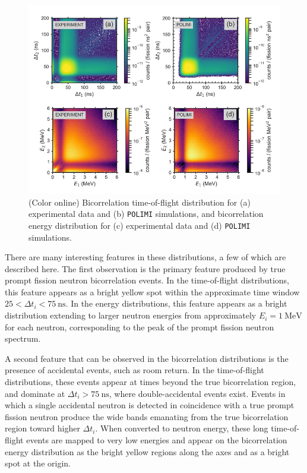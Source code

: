 \documentclass[preprint,12pt]{elsarticle}
\newcommand{\polimi}          {\texttt{POLIMI}\xspace}
\newcommand{\coloronline}     {(Color online)\xspace}
\newcommand{\Dti}{\ensuremath{\Delta t_i}\xspace}
\newcommand{\Ei}{\ensuremath{E_i}\xspace}
\newcommand{\genunit}[2]{\ensuremath{#1~\text{#2}}\xspace}
\newcommand{\MeV}[1]    {\genunit{#1}{MeV}}
\newcommand{\ns}[1]{\genunit{#1}{ns}}
\begin{document}
\begin{figure}[!t]
	\centering
	\includegraphics[trim={0cm 0cm 0cm 0cm},clip,width=7in]{bhm_all.png}
	\caption{\coloronline Bicorrelation time-of-flight distribution for (a) experimental data and (b) \polimi simulations, and bicorrelation energy distribution for (c) experimental data and (d) \polimi simulations.}
	\label{fig:bicorr}
\end{figure}

There are many interesting features in these distributions, a few of which are described here. The first observation is the primary feature produced by true prompt fission neutron bicorrelation events. In the time-of-flight distributions, this feature appears as a bright yellow spot within the approximate time window $25 < \Dti < \ns{75}$. In the energy distributions, this feature appears as a bright distribution extending to larger neutron energies from approximately $\Ei=\MeV{1}$ for each neutron, corresponding to the peak of the prompt fission neutron spectrum.

A second feature that can be observed in the bicorrelation distributions is the presence of accidental events, such as room return. In the time-of-flight distributions, these events appear at times beyond the true bicorrelation region, and dominate at $\Dti > \ns{75}$, where double-accidental events exist. Events in which a single accidental neutron is detected in coincidence with a true prompt fission neutron produce the wide bands emanating from the true bicorrelation region toward higher \Dti. When converted to neutron energy, these long time-of-flight events are mapped to very low energies and appear on the bicorrelation energy distribution as the bright yellow regions along the axes and as a bright spot at the origin. 
\end{document}
